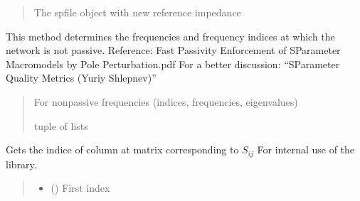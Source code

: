 \documentclass[letterpaper,10pt,english]{sphinxmanual}
\begin{document}
\begin{fulllineitems}
\begin{fulllineitems}
\begin{quote}
\begin{description}
\sphinxAtStartPar
The spfile object with new reference impedance

\sphinxAtStartPar
{\hyperref[\detokenize{touchstone:touchstone.spfile}]{}}

\end{description}\end{quote}

\end{fulllineitems}


\begin{fulllineitems}
\label{\detokenize{touchstone:touchstone.spfile.check_passivity}}
\pysigstartsignatures
{}
\pysigstopsignatures
\sphinxAtStartPar
This method determines the frequencies and frequency indices at which the network is not passive.
Reference: Fast Passivity Enforcement of S\sphinxhyphen{}Parameter Macromodels by Pole Perturbation.pdf
For a better discussion: “S\sphinxhyphen{}Parameter Quality Metrics (Yuriy Shlepnev)”
\begin{quote}\begin{description}
\sphinxAtStartPar
For non\sphinxhyphen{}passive frequencies (indices, frequencies, eigenvalues)

\sphinxhyphen{}tuple of lists

\end{description}\end{quote}

\end{fulllineitems}


\begin{fulllineitems}
\label{\detokenize{touchstone:touchstone.spfile.column_of_data}}
\pysigstartsignatures
{}
\pysigstopsignatures
\sphinxAtStartPar
Gets the indice of column at  matrix corresponding to \(S_{i j}\)
For internal use of the library.
\begin{quote}\begin{description}
\begin{itemize}
\item {} 
\sphinxAtStartPar
{} () \textendash{} First index


\end{itemize}
\end{description}
\end{quote}
\end{fulllineitems}
\end{fulllineitems}
\end{document}
